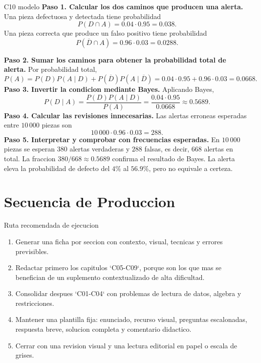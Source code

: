 \begin{fullsolution}{C10 modelo}
\textbf{Paso 1. Calcular los dos caminos que producen una alerta.}
Una pieza defectuosa y detectada tiene probabilidad
\[
P(D\cap A)=0.04\cdot0.95=0.038.
\]
Una pieza correcta que produce un falso positivo tiene probabilidad
\[
P(\overline D\cap A)=0.96\cdot0.03=0.0288.
\]

\textbf{Paso 2. Sumar los caminos para obtener la probabilidad total de alerta.}
Por probabilidad total,
\[
P(A)=P(D)P(A\mid D)+P(\overline D)P(A\mid\overline D)
=0.04\cdot0.95+0.96\cdot0.03=0.0668.
\]
\textbf{Paso 3. Invertir la condicion mediante Bayes.}
Aplicando Bayes,
\[
P(D\mid A)=\frac{P(D)P(A\mid D)}{P(A)}
=\frac{0.04\cdot0.95}{0.0668}\approx0.5689.
\]
\textbf{Paso 4. Calcular las revisiones innecesarias.}
Las alertas erroneas esperadas entre \(10\,000\) piezas son
\[
10\,000\cdot0.96\cdot0.03=288.
\]
\textbf{Paso 5. Interpretar y comprobar con frecuencias esperadas.} En \(10\,000\) piezas se
esperan \(380\) alertas verdaderas y \(288\) falsas, es decir, \(668\) alertas en total. La
fraccion \(380/668\approx0.5689\) confirma el resultado de Bayes. La alerta eleva la probabilidad
de defecto del \(4\%\) al \(56.9\%\), pero no equivale a certeza.
\end{fullsolution}

\chapter{Secuencia de Produccion}

\begin{planningbox}{Ruta recomendada de ejecucion}
\begin{enumerate}
  \item Generar una ficha por seccion con contexto, visual, tecnicas y errores previsibles.
  \item Redactar primero los capitulos `C05-C09`, porque son los que mas se benefician de un
  suplemento contextualizado de alta dificultad.
  \item Consolidar despues `C01-C04` con problemas de lectura de datos, algebra y restricciones.
  \item Mantener una plantilla fija: enunciado, recurso visual, preguntas escalonadas,
  respuesta breve, solucion completa y comentario didactico.
  \item Cerrar con una revision visual y una lectura editorial en papel o escala de grises.
\end{enumerate}
\end{planningbox}

